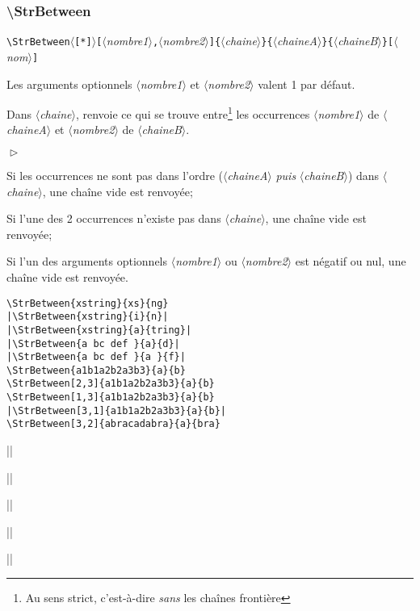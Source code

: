 \documentclass[a4paper,10pt]{article}
\newcommand\argu[1]{$\langle$\textit{#1}$\rangle$}
\newcommand\ARGU[1]{\texttt{\color{black}\{}\argu{#1}\texttt{\color{black}\}}}
\newcommand\arguC[1]{\texttt{\color{black}[}\argu{#1}\texttt{\color{black}]}}
\newcommand\arguCC[2]{\texttt{\color{black}[}\argu{#1}\texttt{\color{black},}\argu{#2}\texttt{\color{black}]}}
\newcommand\etoile{$\langle$\texttt{[*]}$\rangle$}
\newenvironment{Conditions}[1][1cm]%
{\begin{list}%
	{$\vartriangleright$}%
	{\setlength{\leftmargin}{#1}
	 \setlength{\itemsep}{0pt}
	 \setlength{\parsep}{0pt}
	 \setlength{\topsep}{2ptplus3ptminus2pt}
	}}%
{\end{list}}
\newcommand\styleexemple{\small\vskip4pt}
\newcommand\verbinline{\lstinline[basicstyle=\normalsize\ttfamily]}
\begin{document}
\subsubsection{\ttfamily\textbackslash StrBetween}
\verbinline|\StrBetween|\etoile\arguCC{nombre1}{nombre2}\ARGU{chaine}\ARGU{chaineA}\ARGU{chaineB}\arguC{nom}
\smallskip

Les arguments optionnels \argu{nombre1} et \argu{nombre2} valent 1 par défaut.\par\nobreak\smallskip
Dans \argu{chaine}, renvoie ce qui se trouve entre\footnote{Au sens strict, c'est-à-dire \emph{sans} les chaînes frontière} les occurrences \no\argu{nombre1} de \argu{chaineA} et \no \argu{nombre2} de \argu{chaineB}.\medskip

\begin{Conditions}
	\item Si les occurrences ne sont pas dans l'ordre (\argu{chaineA} \emph{puis} \argu{chaineB}) dans \argu{chaine}, une chaîne vide est renvoyée;
	\item Si l'une des 2 occurrences n'existe pas dans \argu{chaine}, une chaîne vide est renvoyée;
	\item Si l'un des arguments optionnels \argu{nombre1} ou \argu{nombre2} est négatif ou nul, une chaîne vide est renvoyée.
\end{Conditions}

\begin{minipage}[t]{0.65\linewidth}
\begin{lstlisting}
\StrBetween{xstring}{xs}{ng}
|\StrBetween{xstring}{i}{n}|
|\StrBetween{xstring}{a}{tring}|
|\StrBetween{a bc def }{a}{d}|
|\StrBetween{a bc def }{a }{f}|
\StrBetween{a1b1a2b2a3b3}{a}{b}
\StrBetween[2,3]{a1b1a2b2a3b3}{a}{b}
\StrBetween[1,3]{a1b1a2b2a3b3}{a}{b}
|\StrBetween[3,1]{a1b1a2b2a3b3}{a}{b}|
\StrBetween[3,2]{abracadabra}{a}{bra}
\end{lstlisting}%
\end{minipage}\hfill
\begin{minipage}[t]{0.35\linewidth}
	\styleexemple
	\par
	||\par
	||\par
	||\par
	||\par
	\par
	\par
	\par
	||\par
	\par
\end{minipage}%
\end{document}
